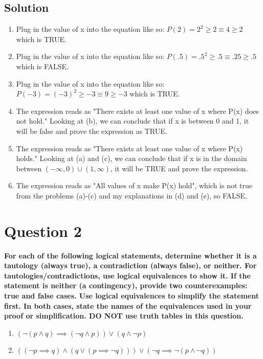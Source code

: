 \documentclass[11pt]{article}
\begin{document}
    \subsection*{Solution}
    \begin{enumerate}[label=(\alph*)]
        \item Plug in the value of x into the equation like so: \(P(2) = 2^2 \geq 2 \equiv 4 \geq 2\) which is TRUE.
        \item Plug in the value of x into the equation like so: \(P(.5) = .5^2 \geq .5 \equiv .25 \geq .5\) which is FALSE.
        \item Plug in the value of x into the equation like so: \(P(-3) = (-3)^2 \geq -3 \equiv 9 \geq -3\) which is TRUE.
        \item The expression reads as "There exists at least one value of x where P(x) does not hold." Looking at (b), we can conclude that if x is between 0 and 1, it will be false and prove the expression as TRUE.
        \item The expression reads as "There exists at least one value of x where P(x) holds." Looking at (a) and (c), we can conclude that if x is in the domain between \((-\infty,0) \cup (1, \infty)\), it will be TRUE and prove the expression.
        \item The expression reads as "All values of x make P(x) hold", which is not true from the problems (a)-(c) and my explanations in (d) and (e), so FALSE.
    \end{enumerate}


\clearpage
\section*{Question 2}
    \textbf{For each of the following logical statements, determine whether it is a tautology (always true), a contradiction (always false), or neither. For tautologies/contradictions, use logical equivalences to show it. If the statement is neither (a contingency), provide two counterexamples: true and false cases. Use logical equivalences to simplify the statement first. In both cases, state the names of the equivalences used in your proof or simplification. DO NOT use truth tables in this question.}
    \begin{enumerate}[label=(\alph*)]
        \item \((\neg(p\land q) \implies (\neg q \land p)) \lor (q \land \neg p)\)
        \item \(((\neg p \implies q) \land (q \lor (p \implies \neg q))) \lor (\neg q \implies \neg (p \land \neg q))\)
    \end{enumerate}
\end{document}
